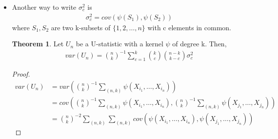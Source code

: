 \documentclass{article}
\theoremstyle{definition}
\newtheorem{theorem}{Theorem}
\numberwithin{Def}{section}
\begin{document}
\begin{itemize}
    Note that there is an easier proof:
    \begin{proof}
    \begin{enumerate}[label = (\roman*)]
        \item We have that for $1 \leq c <d \leq k$
        \begin{align*}
            E(\psi_d(x_1, \dotsc, x_c, X_{c+1}, \dotsc, X_d)) &= E(E(\psi(X_1, \dotsc, X_c, X_{c+1}, \dotsc, X_k)|x_1, \dotsc x_{d})|x_1, \dotsc, x_c)\\
            &= E(\psi(X_1, \dotsc, X_k)|x_1, \dotsc, x_c) &&\text{[since $c<d$]}\\
            &=\psi_c(x_1, \dotsc, x_c)
        \end{align*}
        
        \item 
        \begin{align*}
            E(\psi_c(X_1, \dotsc, X_c)) &= E(E(\psi(X_1, \dotsc, X_k)|x_1, \dotsc, x_c)) \\
            &=E(\psi(X_1, \dotsc, X_k))\\
        \end{align*}
    \end{enumerate}
    \end{proof}
    \item Another way to write $\sigma_c^2$ is 
    \begin{align*}
        \sigma_c^2 = cov(\psi(S_1), \psi(S_2))
    \end{align*}
    where $S_1, S_2$ are two k-subsets of $\{1, 2, \dotsc, n\}$ with c elements in common. 
    
    \begin{theorem}
    Let $U_n$ be a U-statistic with a kernel $\psi$ of degree k. Then, 
    \begin{align}
        var(U_n) = {n \choose k}^{-1}\sum_{c=1}^k{k \choose c}{n-k \choose k-c} \sigma_c^2
    \end{align}
    \end{theorem}
    \begin{proof}
    \begin{align*}
        var(U_n) &= var({n \choose k}^{-1} \sum_{(n,k)}\psi(X_{i_1}, \dotsc, X_{i_n}))\\
        &= cov({n \choose k}^{-1} \sum_{(n,k)}\psi(X_{i_1}, \dotsc, X_{i_n}), {n \choose k}^{-1} \sum_{(n,k)}\psi(X_{j_1}, \dotsc, X_{j_n}))\\
        &= {n \choose k}^{-2}\sum_{(n,k)}\sum_{(n,k)}cov(\psi(X_{i_1}, \dotsc, X_{i_n}), \psi(X_{j_1}, \dotsc, X_{j_n}))
    \end{align*}
    

\end{proof}
\end{itemize}
\end{document}
